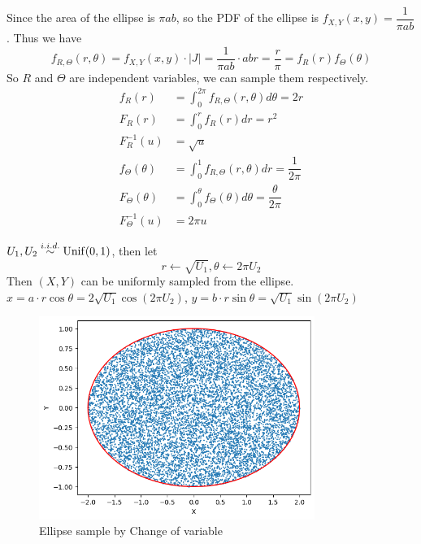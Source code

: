 \begin{homeworkProblem}
Since the area of the ellipse is $\pi ab$, so the PDF of the ellipse is $f_{X, Y}(x, y)=\dfrac{1}{\pi ab}$. Thus we have
$$f_{R, \Theta}(r, \theta)=f_{X, Y}(x, y)\cdot|J|=\dfrac{1}{\pi ab}\cdot abr=\dfrac{r}{\pi}=f_R(r)f_{\Theta}(\theta)$$
So $R$ and $\Theta$ are independent variables, we can sample them respectively.
\begin{align*}
f_R(r) &= \int_{0}^{2\pi}f_{R, \Theta}(r, \theta)d\theta = 2r \\
F_R(r) &= \int_{0}^{r}f_R(r)dr = r^2 \\
F^{-1}_R(u) &= \sqrt{u} \\
f_{\Theta}(\theta) &= \int_{0}^{1}f_{R, \Theta}(r, \theta)dr = \dfrac{1}{2\pi} \\
F_{\Theta}(\theta) &= \int_{0}^{\theta}f_{\Theta}(\theta)d\theta = \dfrac{\theta}{2\pi} \\
F^{-1}_{\Theta}(u) &= 2\pi u
\end{align*}

$U_1, U_2\stackrel{i.i.d.}{\sim} \operatorname{Unif}(0, 1)$, then let
$$r\leftarrow \sqrt{U_1}, \theta\leftarrow 2\pi U_2$$
Then $(X, Y)$ can be uniformly sampled from the ellipse.
$x = a\cdot r\cos\theta = 2\sqrt{U_1}\cos(2\pi U_2)$, $y = b\cdot r\sin\theta = \sqrt{U_1}\sin(2\pi U_2)$
\begin{figure}[h]
    \centering
    \includegraphics[width=0.8\textwidth]{./figure/p7/a_change_variable.png}
    \caption{Ellipse sample by Change of variable}
\end{figure}



\end{homeworkProblem}
